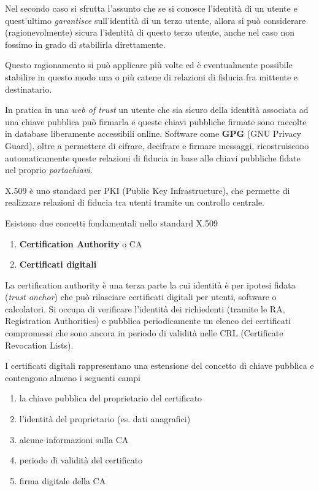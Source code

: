 \documentclass[italian,]{article}
\providecommand{\tightlist}{%
  \setlength{\itemsep}{0pt}\setlength{\parskip}{0pt}}
\begin{document}
Nel secondo caso si sfrutta l'assunto che se si conosce l'identità di un
utente e quest'ultimo \emph{garantisce} sull'identità di un terzo
utente, allora si può considerare (ragionevolmente) sicura l'identità di
questo terzo utente, anche nel caso non fossimo in grado di stabilirla
direttamente.

Questo ragionamento si può applicare più volte ed è eventualmente
possibile stabilire in questo modo una o più catene di relazioni di
fiducia fra mittente e destinatario.

In pratica in una \emph{web of trust} un utente che sia sicuro della
identità associata ad una chiave pubblica può firmarla e queste chiavi
pubbliche firmate sono raccolte in database liberamente accessibili
online. Software come \textbf{GPG} (GNU Privacy Guard), oltre a
permettere di cifrare, decifrare e firmare messaggi, ricostruiscono
automaticamente queste relazioni di fiducia in base alle chiavi
pubbliche fidate nel proprio \emph{portachiavi}.

X.509 è uno standard per PKI (Public Key Infrastructure), che permette
di realizzare relazioni di fiducia tra utenti tramite un controllo
centrale.

Esistono due concetti fondamentali nello standard X.509

\begin{enumerate}
\def\labelenumi{\arabic{enumi}.}
\tightlist
\item
  \textbf{Certification Authority} o CA
\item
  \textbf{Certificati digitali}
\end{enumerate}

La certification authority è una terza parte la cui identità è per
ipotesi fidata (\emph{trust anchor}) che può rilasciare certificati
digitali per utenti, software o calcolatori. Si occupa di verificare
l'identità dei richiedenti (tramite le RA, Registration Authorities) e
pubblica periodicamente un elenco dei certificati compromessi che sono
ancora in periodo di validità nelle CRL (Certificate Revocation Lists).

I certificati digitali rappresentano una estensione del concetto di
chiave pubblica e contengono almeno i seguenti campi

\begin{enumerate}
\def\labelenumi{\arabic{enumi}.}
\tightlist
\item
  la chiave pubblica del proprietario del certificato
\item
  l'identità del proprietario (es. dati anagrafici)
\item
  alcune informazioni sulla CA
\item
  periodo di validità del certificato
\item
  firma digitale della CA
\end{enumerate}
\end{document}
